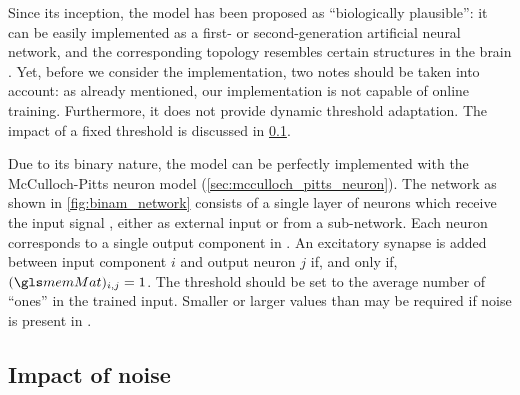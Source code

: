 Since its inception, the \BiNAM model has been proposed as \enquote{biologically plausible}: it can be easily implemented as a first- or second-generation artificial neural network, and the corresponding topology resembles certain structures in the brain \cite{BiNAM1969, palm1980associative}. Yet, before we consider the implementation, two notes should be taken into account: as already mentioned, our implementation is not capable of online training. Furthermore, it does not provide dynamic threshold adaptation. The impact of a fixed threshold \threshold is discussed in \cref{sec:binam_failure_modes}.

Due to its binary nature, the \BiNAM model can be perfectly implemented with the McCulloch-Pitts neuron model (\cref{sec:mcculloch_pitts_neuron}). The network as shown in \cref{fig:binam_network} consists of a single layer of \dimOut neurons which receive the input signal \vIn, either as external input or from a sub-network. Each neuron corresponds to a single output component in \vOut. An excitatory synapse is added between input component $i$ and output neuron $j$ if, and only if, $(\memMat)_{i, j} = 1$. The threshold \threshold should be set to the average number of \enquote{ones} \nOnesIn in the trained input. Smaller or larger values than \nOnesIn may be required if noise is present in \vIn.

\subsection{Impact of noise}
\label{sec:binam_failure_modes}


